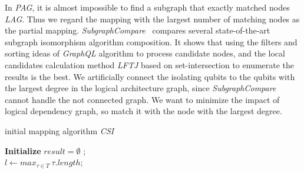 \documentclass[runningheads]{llncs}
\begin{document}
In \textit{PAG}, it is almost impossible to find a subgraph that exactly matched nodes \textit{LAG}. Thus we regard the mapping with the largest number of matching nodes as the partial mapping. \textit{SubgraphCompare}~\cite{Sun2020} compares several state-of-the-art subgraph isomorphism algorithm composition. 
It shows that using the filters and sorting ideas of \textit{GraphQL} algorithm to process candidate nodes, and the local candidates calculation method \textit{LFTJ} based on set-intersection to enumerate the results is the best. We artificially connect the isolating qubits to the qubits with the largest degree in the logical architecture graph, since \textit{SubgraphCompare} cannot handle the not connected graph. We want to minimize the impact of logical dependency graph, so match it with the node with the largest degree.
\begin{algorithm}  
	\label{algorithm_initial}
	\caption{initial mapping algorithm \textit{CSI}}  
	\LinesNumbered  
	\textbf{Initialize} $result=\emptyset$ ;\\
	$l \leftarrow max_{\tau \in T} \  \tau.length$; \\
\end{algorithm}
\end{document}
